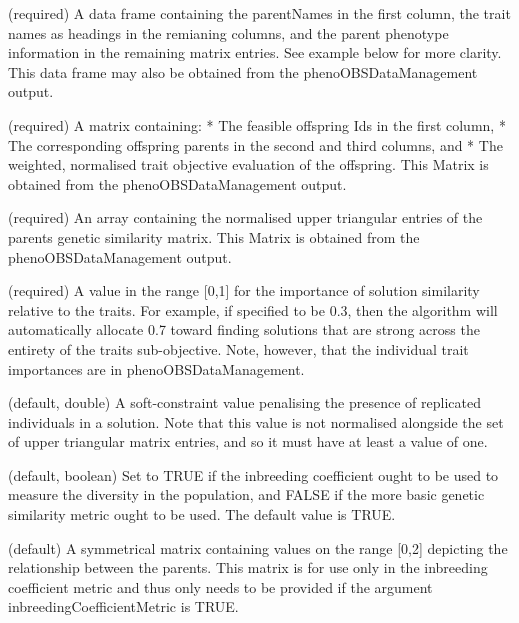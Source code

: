\documentclass[a4paper]{book}
\begin{document}
%
\begin{Arguments}
\begin{ldescription}
\item[\code{parentsPhenotypeDataFrame}] (required) A data frame containing the parentNames in the first column, the trait names as headings in the remianing columns, and the parent phenotype information in the remaining matrix entries.
See example below for more clarity.
This data frame may also be obtained from the phenoOBSDataManagement output.

\item[\code{offspringPhenotype}] (required) A matrix containing:
* The feasible offspring Ids in the first column,
* The corresponding offspring parents in the second and third columns, and
* The weighted, normalised trait objective evaluation of the offspring.
This Matrix is obtained from the phenoOBSDataManagement output.

\item[\code{parentsGeneticSimilarityArray}] (required) An array containing the normalised upper triangular entries of the parents genetic similarity matrix.
This Matrix is obtained from the phenoOBSDataManagement output.

\item[\code{geneticSimilarityWeight}] (required) A value in the range [0,1] for the importance of solution similarity relative to the traits.
For example, if specified to be 0.3, then the algorithm will automatically allocate 0.7 toward finding solutions that are strong across the entirety of the traits sub-objective.
Note, however, that the individual trait importances are in phenoOBSDataManagement.

\item[\code{penaltyReplicatedIndividuals}] (default, double) A soft-constraint value penalising the presence of replicated individuals in a solution.
Note that this value is not normalised alongside the set of upper triangular matrix entries, and so it must have at least a value of one.

\item[\code{inbreedingCoefficientMetric}] (default, boolean) Set to TRUE if the inbreeding coefficient ought to be used to measure the diversity in the population, and FALSE if the more basic genetic similarity metric ought to be used.
The default value is TRUE.

\item[\code{Gmatrix}] (default) A symmetrical matrix containing values on the range [0,2] depicting the relationship between the parents.
This matrix is for use only in the inbreeding coefficient metric and thus only needs to be provided if the argument inbreedingCoefficientMetric is TRUE.


\end{ldescription}
\end{Arguments}
\end{document}
